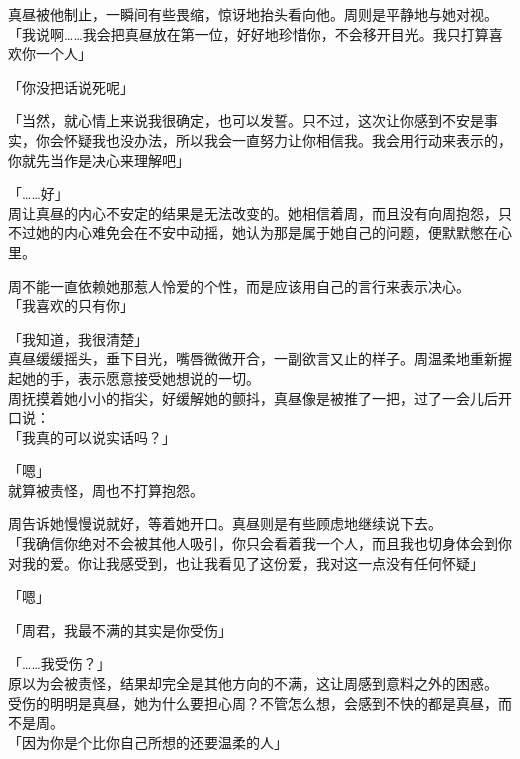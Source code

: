真昼被他制止，一瞬间有些畏缩，惊讶地抬头看向他。周则是平静地与她对视。\\

「我说啊……我会把真昼放在第一位，好好地珍惜你，不会移开目光。我只打算喜欢你一个人」

「你没把话说死呢」

「当然，就心情上来说我很确定，也可以发誓。只不过，这次让你感到不安是事实，你会怀疑我也没办法，所以我会一直努力让你相信我。我会用行动来表示的，你就先当作是决心来理解吧」

「……好」\\

周让真昼的内心不安定的结果是无法改变的。她相信着周，而且没有向周抱怨，只不过她的内心难免会在不安中动摇，她认为那是属于她自己的问题，便默默憋在心里。

周不能一直依赖她那惹人怜爱的个性，而是应该用自己的言行来表示决心。\\

「我喜欢的只有你」

「我知道，我很清楚」\\

真昼缓缓摇头，垂下目光，嘴唇微微开合，一副欲言又止的样子。周温柔地重新握起她的手，表示愿意接受她想说的一切。\\

周抚摸着她小小的指尖，好缓解她的颤抖，真昼像是被推了一把，过了一会儿后开口说：\\

「我真的可以说实话吗？」

「嗯」\\

就算被责怪，周也不打算抱怨。

周告诉她慢慢说就好，等着她开口。真昼则是有些顾虑地继续说下去。\\

「我确信你绝对不会被其他人吸引，你只会看着我一个人，而且我也切身体会到你对我的爱。你让我感受到，也让我看见了这份爱，我对这一点没有任何怀疑」

「嗯」

「周君，我最不满的其实是你受伤」

「……我受伤？」\\

原以为会被责怪，结果却完全是其他方向的不满，这让周感到意料之外的困惑。\\

受伤的明明是真昼，她为什么要担心周？不管怎么想，会感到不快的都是真昼，而不是周。\\

「因为你是个比你自己所想的还要温柔的人」\\

